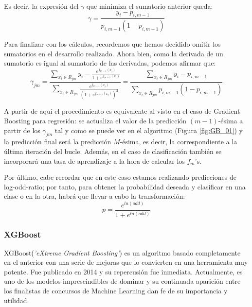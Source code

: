\documentclass[12pt,twoside]{article}
\begin{document}
Es decir, la expresión del $\gamma$ que minimiza el sumatorio anterior queda:
\begin{equation*}
\gamma = \frac{y_i - p_{i, m-1}}{p_{i, m-1}(1 - p_{i, m-1})}
\end{equation*}

Para finalizar con los cálculos, recordemos que hemos decidido omitir los sumatorios en el desarrollo realizado. Ahora bien, como la derivada de un sumatorio es igual al sumatorio de las derivadas, podemos afirmar que:
\begin{equation*}
\gamma_{jm} = \frac{\displaystyle \sum_{x_i \in R_{jm}} y_i - \frac{e^{f_{m-1}(x_i)}}{1 + e^{f_{m-1}(x_i)}}}{\displaystyle \sum_{x_i \in R_{jm}} \frac{e^{f_{m-1}(x_i)}}{(1 + e^{f_{m-1}(x_i)})^2}} = \frac{\displaystyle \sum_{x_i \in R_{jm}} y_i - p_{i, m-1}}{\displaystyle \sum_{x_i \in R_{jm}} p_{i, m-1}(1 - p_{i, m-1})}
\end{equation*}

A partir de aquí el procedimiento es equivalente al visto en el caso de Gradient Boosting para regresión: se actualiza el valor de la predicción $(m-1)$-ésima a partir de los $\gamma_{jm}$ tal y como se puede ver en el algoritmo (Figura \ref{fig:GB_01}) y la predicción final será la predicción $M$-ésima, es decir, la correspondiente a la última iteración del bucle. Además, en el caso de clasificación también se incorporará una tasa de aprendizaje a la hora de calcular los $f_m$'s.

Por último, cabe recordar que en este caso estamos realizando predicciones de log-odd-ratio; por tanto, para obtener la probabilidad deseada y clasificar en una clase o en la otra, habrá que llevar a cabo la transformación:
\begin{equation*}
p = \frac{e^{ln(odd)}}{1 + e^{ln(odd)}}
\end{equation*}





\subsubsection{XGBoost} \label{sec:XGBoost}
XGBoost(\textit{'eXtreme Gradient Boosting'}) es un algoritmo basado completamente en el anterior con una serie de mejoras que lo convierten en una herramienta muy potente. Fue publicado en 2014 y su repercusión fue inmediata. Actualmente, es uno de los modelos imprescindibles de dominar y su continuada aparición entre los finalistas de concursos de Machine Learning dan fe de su importancia y utilidad.
\end{document}
